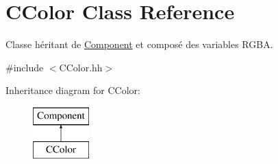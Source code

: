 \hypertarget{class_c_color}{}\section{C\+Color Class Reference}
\label{class_c_color}


Classe héritant de \hyperlink{class_component}{Component} et composé des variables R\+G\+B\+A.  




{\ttfamily \#include $<$C\+Color.\+hh$>$}

Inheritance diagram for C\+Color\+:\begin{figure}[H]
\begin{center}
\leavevmode
\includegraphics[height=2.000000cm]{class_c_color}
\end{center}
\end{figure}
